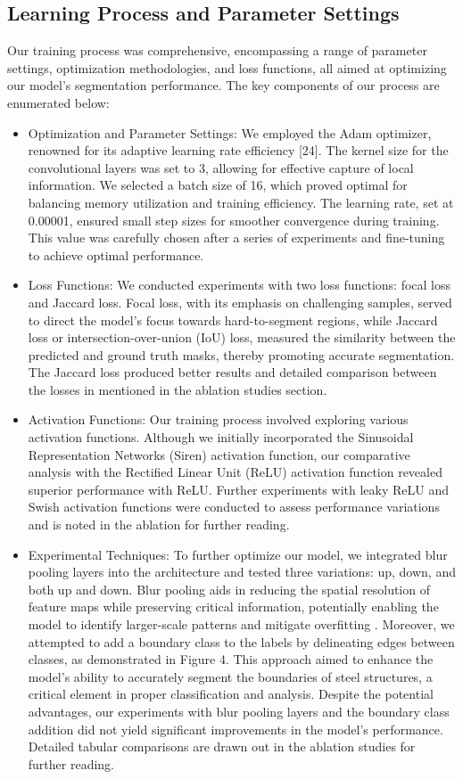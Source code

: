 \documentclass[]{article}
\begin{document}
\subsection{Learning Process and Parameter Settings}

Our training process was comprehensive, encompassing a range of parameter settings, optimization methodologies, and loss functions, all aimed at optimizing our model's segmentation performance. The key components of our process are enumerated below:

\begin{itemize}
	\item Optimization and Parameter Settings: We employed the Adam optimizer, renowned for its adaptive learning rate efficiency [24]. The kernel size for the convolutional layers was set to 3, allowing for effective capture of local information. We selected a batch size of 16, which proved optimal for balancing memory utilization and training efficiency. The learning rate, set at 0.00001, ensured small step sizes for smoother convergence during training. This value was carefully chosen after a series of experiments and fine-tuning to achieve optimal performance.
	\item Loss Functions: We conducted experiments with two loss functions: focal loss and Jaccard loss. Focal loss, with its emphasis on challenging samples, served to direct the model's focus towards hard-to-segment regions, while Jaccard loss or intersection-over-union (IoU) loss, measured the similarity between the predicted and ground truth masks, thereby promoting accurate segmentation. The Jaccard loss produced better results and detailed comparison between the losses in mentioned in the ablation studies section.
	\item Activation Functions: Our training process involved exploring various activation functions. Although we initially incorporated the Sinusoidal Representation Networks (Siren) activation function, our comparative analysis with the Rectified Linear Unit (ReLU) activation function revealed superior performance with ReLU. Further experiments with leaky ReLU and Swish activation functions were conducted to assess performance variations and is noted in the ablation for further reading.
	\item Experimental Techniques: To further optimize our model, we integrated blur pooling layers into the architecture and tested three variations: up, down, and both up and down. Blur pooling aids in reducing the spatial resolution of feature maps while preserving critical information, potentially enabling the model to identify larger-scale patterns and mitigate overfitting \cite{blurPooling}. Moreover, we attempted to add a boundary class to the labels by delineating edges between classes, as demonstrated in Figure 4. This approach aimed to enhance the model's ability to accurately segment the boundaries of steel structures, a critical element in proper classification and analysis. Despite the potential advantages, our experiments with blur pooling layers and the boundary class addition did not yield significant improvements in the model's performance. Detailed tabular comparisons are drawn out in the ablation studies for further reading.
	

\end{itemize}
\end{document}

